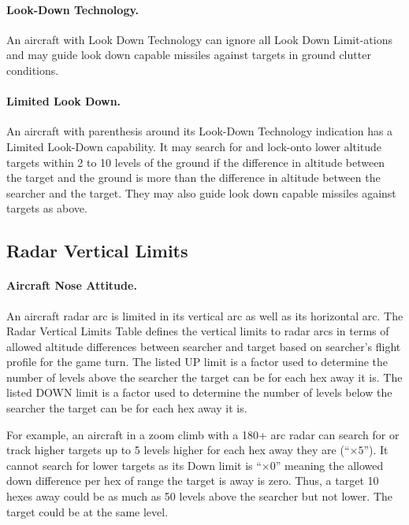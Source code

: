 \paragraph{Look-Down Technology.} An aircraft with Look Down Technology can ignore all Look Down Limit-ations and may guide look down capable missiles against targets in ground clutter conditions.

\paragraph{Limited Look Down.} An aircraft with parenthesis around its Look-Down Technology indication has a Limited Look-Down capability.  It may search for and lock-onto lower altitude targets within 2 to 10 levels of the ground if the difference in altitude between the target and the ground is more than the difference in altitude between the searcher and the target. They may also guide look down capable missiles against targets as above.

\subsection{Radar Vertical Limits}

\paragraph{Aircraft Nose Attitude.} An aircraft radar arc is limited in its vertical arc as well as its horizontal arc. The Radar Vertical Limits Table defines the vertical limits to radar arcs in terms of allowed altitude differences between searcher and target based on searcher's flight profile for the game turn. The listed UP limit is a factor used to determine the number of levels above the searcher the target can be for each hex away it is. The listed DOWN limit is a factor used to determine the number of levels below the searcher the target can be for each hex away it is. 

For example, an aircraft in a zoom climb with a 180+ arc radar can search for or track higher targets up to 5 levels higher for each hex away they are (“$\times5$”). It cannot search for lower targets as its Down limit is “$\times0$” meaning the allowed down difference per hex of range the target is away is zero. Thus, a target 10 hexes away could be as much as 50 levels above the searcher but not lower. The target could be at the same level.

